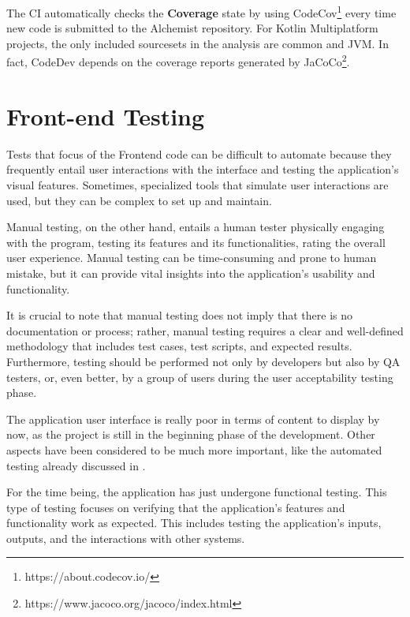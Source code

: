 The CI automatically checks the \textbf{Coverage} state by using CodeCov\footnote{https://about.codecov.io/} every time new code is submitted to the Alchemist repository. For Kotlin Multiplatform projects, the only included sourcesets in the analysis are common and JVM. In fact, CodeDev depends on the coverage reports generated by JaCoCo\footnote{https://www.jacoco.org/jacoco/index.html}.

\section{Front-end Testing}
\label{sec:front-end-testing}
Tests that focus of the Frontend code can be difficult to automate because they frequently entail user interactions with the interface and testing the application's visual features. Sometimes, specialized tools that simulate user interactions are used, but they can be complex to set up and maintain.\newline

Manual testing, on the other hand, entails a human tester physically engaging with the program, testing its features and its functionalities, rating the overall user experience. Manual testing can be time-consuming and prone to human mistake, but it can provide vital insights into the application's usability and functionality.\newline

It is crucial to note that manual testing does not imply that there is no documentation or process; rather, manual testing requires a clear and well-defined methodology that includes test cases, test scripts, and expected results. Furthermore, testing should be performed not only by developers but also by QA testers, or, even better, by a group of users during the user acceptability testing phase.\newline

The application user interface is really poor in terms of content to display by now, as the project is still in the beginning phase of the development. Other aspects have been considered to be much more important, like the automated testing already discussed in .\newline

For the time being, the application has just undergone functional testing. This type of testing focuses on verifying that the application's features and functionality work as expected. This includes testing the application's inputs, outputs, and the interactions with other systems.\newline

